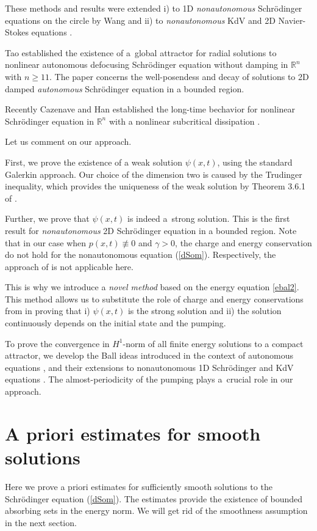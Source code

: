 \documentclass[11pt]{article}
\newcommand{\R}{{\mathbb R}}
\newcommand{\ga}{\gamma}
\newcommand{\5}{{\hspace{0.5mm}}}
\numberwithin{equation}{section}
\newcommand{\ci}{\cite}
\newcommand{\la}{\label}
\numberwithin{equation}{section}
\begin{document}
These methods and results were extended i) to 1D {\it nonautonomous}
Schr\"odinger equations on the circle by Wang \ci{W1995}
 and ii) to {\it nonautonomous} KdV and 2D Navier-Stokes equations \ci{MRW2004}.

Tao \ci{T2008} established 
the existence of a~global attractor for radial solutions to
nonlinear autonomous
defocusing Schr\"odinger equation without damping in $\R^n$ with $n\ge 11$.
The paper \ci{S2015} concerns the well-posendess and decay of solutions to 2D damped
{\it autonomous} Schr\"odinger equation in a bounded region.

Recently Cazenave and Han established the long-time bechavior
for nonlinear Schr\"odinger equation in $\R^n$ with a nonlinear subcritical dissipation \ci{CH2020}.
\smallskip

Let us comment on our approach.

First, we prove the existence of a weak solution $\psi(x,t)$, using the standard 
Galerkin approach. Our choice of the dimension two is caused by
the Trudinger inequality, which provides the uniqueness of the weak solution by Theorem 3.6.1 of \ci{C2003}.


Further, we prove that $\psi(x,t)$ is indeed a~strong solution.
This is the first result for {\it nonautonomous}
2D Schr\"odinger equation in a bounded region.
 Note that in our case when $p(x,t)\not\equiv 0$ and $\ga> 0$, the charge and energy conservation do not hold for the nonautonomous equation (\ref{dSom}).
Respectively, the approach of \ci{C2003} is not applicable here.


This is why we introduce a {\it novel method} based on the energy equation \eqref{ebal2}.
This method
allows us to substitute the role of charge and energy conservations from \ci{C2003}
in proving that i) $\psi(x,t)$ is the strong solution and
ii) the solution continuously depends on the initial state and the pumping.


  To prove
the convergence in $H^1$-norm of all finite energy solutions to a compact attractor,
we develop the Ball ideas introduced in the context of autonomous equations \ci{B2004}, and their extensions to nonautonomous 1D Schr\"odinger and KdV equations \ci{W1995,MRW2004}.
The almost-periodicity of the pumping plays a~crucial role in our approach.

\section{A priori estimates for smooth solutions}\la{s2}
Here we prove a priori estimates for sufficiently smooth solutions to the Schr\"odinger equation (\ref{dSom}).
The estimates provide the existence of bounded absorbing sets in the energy norm.
We will get rid of the smoothness assumption in the next section.
\end{document}
